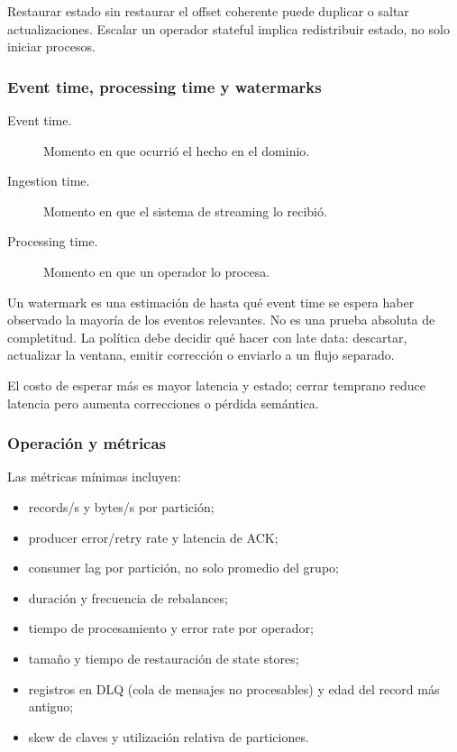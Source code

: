 \documentclass[variant=docente,cover=institutional,mode=screen]{ua-engineering-v6-article}
\begin{document}
Restaurar estado sin restaurar el offset coherente puede duplicar o saltar actualizaciones. Escalar un operador stateful implica redistribuir estado, no solo iniciar procesos.

\subsubsection{Event time, processing time y watermarks}

\begin{description}
\item[Event time.] Momento en que ocurrió el hecho en el dominio.
\item[Ingestion time.] Momento en que el sistema de streaming lo recibió.
\item[Processing time.] Momento en que un operador lo procesa.
\end{description}

Un watermark es una estimación de hasta qué event time se espera haber observado la mayoría de los eventos relevantes. No es una prueba absoluta de completitud. La política debe decidir qué hacer con late data: descartar, actualizar la ventana, emitir corrección o enviarlo a un flujo separado.

El costo de esperar más es mayor latencia y estado; cerrar temprano reduce latencia pero aumenta correcciones o pérdida semántica.

\subsubsection{Operación y métricas}

Las métricas mínimas incluyen:
\begin{itemize}
\item records/s y bytes/s por partición;
\item producer error/retry rate y latencia de ACK;
\item consumer lag por partición, no solo promedio del grupo;
\item duración y frecuencia de rebalances;
\item tiempo de procesamiento y error rate por operador;
\item tamaño y tiempo de restauración de state stores;
\item registros en DLQ (cola de mensajes no procesables) y edad del record más antiguo;
\item skew de claves y utilización relativa de particiones.
\end{itemize}
\end{document}
